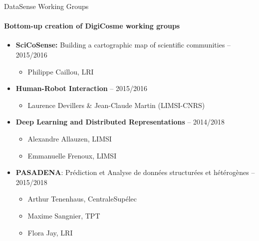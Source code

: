 \begin{frame}{DataSense Working Groups}
  \framesubtitle{Bottom-up creation of DigiCosme working groups}

      \begin{itemize}    
      \item \textbf{SciCoSense:} Building a cartographic map of scientific communities -- 2015/2016
        \begin{itemize}
        \item Philippe Caillou, LRI
        \end{itemize}

      \item \textbf{Human-Robot Interaction} -- 2015/2016
        \begin{itemize}
        \item Laurence Devillers \& Jean-Claude Martin (LIMSI-CNRS) 
        \end{itemize}

      \item \textbf{Deep Learning and Distributed Representations} -- 2014/2018
        \begin{itemize}
        \item Alexandre Allauzen, LIMSI 
        \item Emmanuelle Frenoux, LIMSI 
        \end{itemize}

      \item \textbf{PASADENA}: Pr\'ediction et Analyse de donn\'ees structur\'ees et h\'et\'erog\`enes -- 2015/2018
        \begin{itemize}
          \item Arthur Tenenhaus, CentraleSup\'elec
          \item Maxime Sangnier, TPT 
          \item Flora Jay, LRI
        \end{itemize}

      \end{itemize}
\end{frame}

